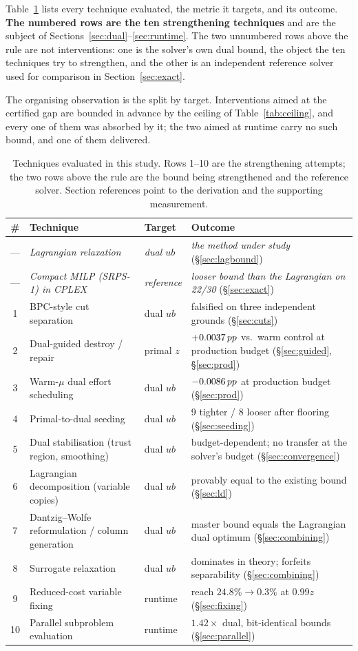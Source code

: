 Table~\ref{tab:coverage} lists every technique evaluated, the metric it targets, and its outcome. \textbf{The numbered rows are the ten strengthening techniques} and are the subject of Sections~\ref{sec:dual}--\ref{sec:runtime}. The two unnumbered rows above the rule are not interventions: one is the solver's own dual bound, the object the ten techniques try to strengthen, and the other is an independent reference solver used for comparison in Section~\ref{sec:exact}.

The organising observation is the split by target. Interventions aimed at the certified gap are bounded in advance by the ceiling of Table~\ref{tab:ceiling}, and every one of them was absorbed by it; the two aimed at runtime carry no such bound, and one of them delivered.

\begin{table}[htbp]
\centering
\small
\caption{Techniques evaluated in this study. Rows 1--10 are the strengthening attempts; the two rows above the rule are the bound being strengthened and the reference solver. Section references point to the derivation and the supporting measurement.}
\label{tab:coverage}
\begin{tabular}{clll}
\toprule
\# & Technique & Target & Outcome \\
\midrule
--- & \emph{Lagrangian relaxation} & \emph{dual $ub$} & \emph{the method under study} (\S\ref{sec:lagbound}) \\
--- & \emph{Compact MILP (SRPS-1) in CPLEX} & \emph{reference} & \emph{looser bound than the Lagrangian on 22/30} (\S\ref{sec:exact}) \\
\midrule
1 & BPC-style cut separation & dual $ub$ & falsified on three independent grounds (\S\ref{sec:cuts}) \\
2 & Dual-guided destroy / repair & primal $z$ & $+0.0037\,pp$ vs.\ warm control at production budget (\S\ref{sec:guided}, \S\ref{sec:prod}) \\
3 & Warm-$\mu$ dual effort scheduling & dual $ub$ & $-0.0086\,pp$ at production budget (\S\ref{sec:prod}) \\
4 & Primal-to-dual seeding & dual $ub$ & 9 tighter / 8 looser after flooring (\S\ref{sec:seeding}) \\
5 & Dual stabilisation (trust region, smoothing) & dual $ub$ & budget-dependent; no transfer at the solver's budget (\S\ref{sec:convergence}) \\
6 & Lagrangian decomposition (variable copies) & dual $ub$ & provably equal to the existing bound (\S\ref{sec:ld}) \\
7 & Dantzig--Wolfe reformulation / column generation & dual $ub$ & master bound equals the Lagrangian dual optimum (\S\ref{sec:combining}) \\
8 & Surrogate relaxation & dual $ub$ & dominates in theory; forfeits separability (\S\ref{sec:combining}) \\
9 & Reduced-cost variable fixing & runtime & reach $24.8\%\to0.3\%$ at $0.99z$ (\S\ref{sec:fixing}) \\
10 & Parallel subproblem evaluation & runtime & $\mathbf{1.42\times}$ dual, bit-identical bounds (\S\ref{sec:parallel}) \\
\bottomrule
\end{tabular}
\end{table}
